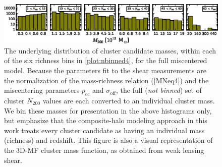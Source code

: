 \begin{figure}
\begin{center}
  \includegraphics[scale=1.0]{plots_ch4/m200panels_NoGaps.eps}
  \caption[Cluster Mass Distributions for each Richness Bin]{The underlying distribution of cluster candidate masses, within each of the six richness bins in \autoref{plot:nbinned4}, for the full miscentered model. Because the parameters fit to the shear measurements are the normalization of the mass-richness relation (\autoref{MNeq4}) and the miscentering parameters $p_{\mathrm{cc}}$ and $\sigma_{\mathrm{off}}$, the full ({\it not binned}) set of cluster $N_{200}$ values are each converted to an individual cluster mass. We bin these masses for presentation in the above histograms only, but emphasize that the composite-halo modeling approach in this work treats every cluster candidate as having an individual mass (richness) and redshift. This figure is also a visual representation of the \ac{3D-MF} cluster mass function, as obtained from weak lensing shear.}
\label{plot:multimass4}
\end{center}
\end{figure}


